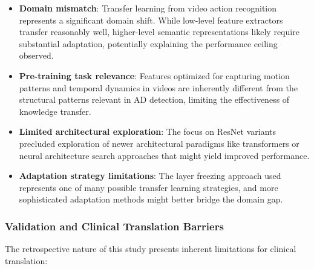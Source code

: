 \documentclass[12pt, a4paper]{article}
\begin{document}
\begin{itemize}
    \item \textbf{Domain mismatch}: Transfer learning from video action recognition represents a significant domain shift. While low-level feature extractors transfer reasonably well, higher-level semantic representations likely require substantial adaptation, potentially explaining the performance ceiling observed.
    
    \item \textbf{Pre-training task relevance}: Features optimized for capturing motion patterns and temporal dynamics in videos are inherently different from the structural patterns relevant in AD detection, limiting the effectiveness of knowledge transfer.
    
    \item \textbf{Limited architectural exploration}: The focus on ResNet variants precluded exploration of newer architectural paradigms like transformers or neural architecture search approaches that might yield improved performance.
    
    \item \textbf{Adaptation strategy limitations}: The layer freezing approach used represents one of many possible transfer learning strategies, and more sophisticated adaptation methods might better bridge the domain gap.
\end{itemize}

\subsubsection{Validation and Clinical Translation Barriers}

The retrospective nature of this study presents inherent limitations for clinical translation:
\end{document}
